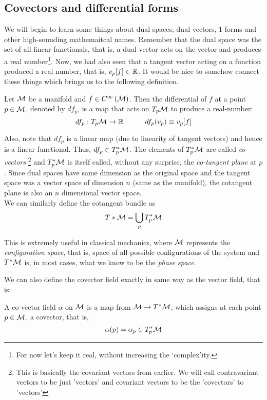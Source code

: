\subsection{Covectors and differential forms}
We will begin to learn some things about dual spaces, dual vectors, 1-forms and other high-sounding mathemaitcal names. Remember that the dual space was the set of all linear functionals, that is, a dual vector acts on the vector and produces a real number\footnote{For now let's keep it real, without increasing the `complex'ity.}. Now, we had also seen that a tangent vector acting on a function produced a real number, that is, $v_p[f]\in \mathbb{R}$. It would be nice to somehow connect these things which brings us to the following definition. 
\begin{definition}
    Let $\mathcal M$ be a manifold and $f\in C^{\infty}\left(\mathcal M\right)$.  Then the differential of $f$ at a point $p\in\mathcal M$, denoted by $df_p$, is a map that acts on $T_p\mathcal M$ to produce a real-number:
    $$df_p:T_p\mathcal M\rightarrow \mathbb{R}\quad\quad\quad df_p(v_p) \equiv v_p[f]$$
\end{definition}
Also, note that $df_p$ is a linear map (due to linearity of tangent vectors) and hence is a linear functional. Thus, $df_p\in T_p^*\mathcal M$. The elements of $T_p^*\mathcal M$ are called \textit{co-vectors} \footnote{This is basically the covariant vectors from earlier. We will call contravariant vectors to be just 'vectors' and covariant vectors to be the 'covectors' to 'vectors'} and $T_p^*\mathcal M$ is itself called, without any surprise, the \textit{co-tangent plane} at $p$. Since dual spaces have same dimension as the original space and the tangent space was a vector space of dimension $n$ (same as the manifold), the cotangent plane is also an $n$ dimensional vector space.\\[0.2cm]
We can similarly define the cotangent bundle as 
$$T*\mathcal M = \bigcup\limits_p T^*_p\mathcal M$$
\begin{ffact}
This is extremely useful in classical mechanics, where $\mathcal M$ represents the \textit{configuration space}, that is, space of all possible configurations of the system and $T^*\mathcal M$ is, in most cases, what we know to be the \textit{phase space}.
\end{ffact}
We can also define the covector field exactly in same way as the vector field, that is:
\begin{definition}
    A co-vector field $\alpha$ on $\mathcal M$ is a map from $\mathcal M \rightarrow T^*\mathcal M$, which assigns at each point $p\in\mathcal M$, a covector, that is,
    $$\alpha(p) = \alpha_p\in T_p^*\mathcal M$$
\end{definition}
